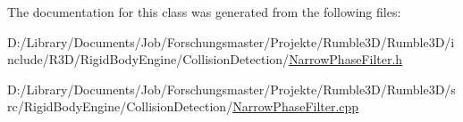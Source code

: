 The documentation for this class was generated from the following files\+:\begin{DoxyCompactItemize}
\item 
D\+:/\+Library/\+Documents/\+Job/\+Forschungsmaster/\+Projekte/\+Rumble3\+D/\+Rumble3\+D/include/\+R3\+D/\+Rigid\+Body\+Engine/\+Collision\+Detection/\mbox{\hyperlink{_narrow_phase_filter_8h}{Narrow\+Phase\+Filter.\+h}}\item 
D\+:/\+Library/\+Documents/\+Job/\+Forschungsmaster/\+Projekte/\+Rumble3\+D/\+Rumble3\+D/src/\+Rigid\+Body\+Engine/\+Collision\+Detection/\mbox{\hyperlink{_narrow_phase_filter_8cpp}{Narrow\+Phase\+Filter.\+cpp}}\end{DoxyCompactItemize}
